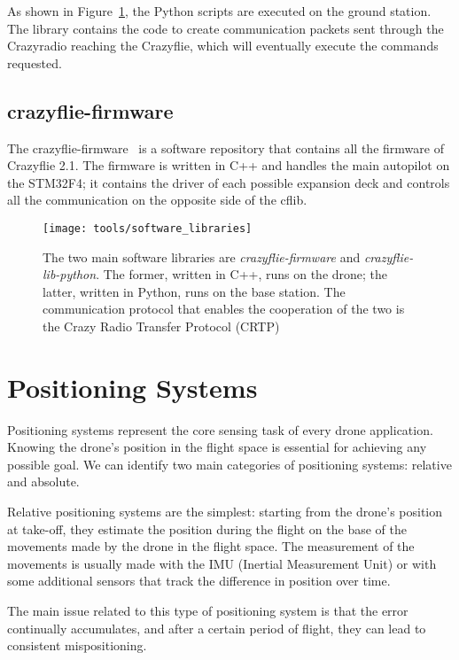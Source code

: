 As shown in Figure~\ref{fig:software_libraries}, the Python scripts are executed on the ground station.
The library contains the code to create communication packets sent through the Crazyradio reaching the Crazyflie, which will eventually execute the commands requested. 

\subsection{crazyflie-firmware}\label{subsec:crazyflie-firmware}
The crazyflie-firmware~\cite{crazyflie-firmware} is a software repository that contains all the firmware of Crazyflie 2.1. 
The firmware is written in C++ and handles the main autopilot on the STM32F4; it contains the driver of each possible expansion deck and controls all the communication on the opposite side of the cflib.


\begin{figure}[h]
    \centering
    \texttt{[image: tools/software\_libraries]}
    \caption[Software libraries integration]{
        The two main software libraries are \textit{crazyflie-firmware} and \textit{crazyflie-lib-python}. 
        The former, written in C++, runs on the drone; the latter, written in Python, runs on the base station. 
        The communication protocol that enables the cooperation of the two is the Crazy Radio Transfer Protocol (CRTP)}\label{fig:software_libraries}
\end{figure}


\section{Positioning Systems}\label{sec:positioning_systems}
Positioning systems represent the core sensing task of every drone application. 
Knowing the drone's position in the flight space is essential for achieving any possible goal.
We can identify two main categories of positioning systems: relative and absolute. 

Relative positioning systems are the simplest: starting from the drone's position at take-off, they estimate the position during the flight on the base of the movements made by the drone in the flight space. 
The measurement of the movements is usually made with the IMU (Inertial Measurement Unit) or with some additional sensors that track the difference in position over time.

The main issue related to this type of positioning system is that the error continually accumulates, and after a certain period of flight, they
can lead to consistent mispositioning.

